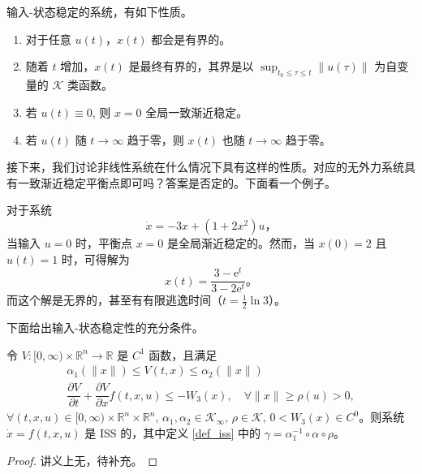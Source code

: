 \begin{note}
    输入-状态稳定的系统，有如下性质。
    \begin{enumerate}
        \item 对于任意 $u (t)$，$x (t)$ 都会是有界的。
        \item 随着 $t$ 增加，$x (t)$ 是最终有界的，其界是以 $\sup_{t_0 \leq \tau \leq t} \|  u (\tau) \|$ 为自变量的 $\mathcal{K}$ 类函数。
        \item 若 $u (t) \equiv 0$, 则 $x = 0$ 全局一致渐近稳定。
        \item 若 $u (t)$ 随 $t \rightarrow \infty$ 趋于零，则 $x(t)$ 也随 $t \to \infty$ 趋于零。
    \end{enumerate}
\end{note}

接下来，我们讨论非线性系统在什么情况下具有这样的性质。对应的无外力系统具有一致渐近稳定平衡点即可吗？答案是否定的。下面看一个例子。

\begin{example}
    对于系统
    \[
        \dot{x} = -3x + (1 + 2 x^2) u \text{，}
    \]
    当输入 $u = 0$ 时，平衡点 $x = 0$ 是全局渐近稳定的。然而，当 $x(0) = 2$ 且 $u(t) = 1$ 时，可得解为
    \[
        x(t) = \dfrac{3 - \mathrm{e}^t}{3 - 2 \mathrm{e}^t} \text{。}
    \]
    而这个解是无界的，甚至有有限逃逸时间（$t = \frac{1}{2} \ln{3}$）。
\end{example}

下面给出输入-状态稳定性的充分条件。

\begin{theorem}[输入-状态稳定性的充分条件]
    令 $V : [ 0, \infty ) \times \mathbb{R}^n \to \mathbb{R}$ 是 $C^1$ 函数，且满足
    \begin{gather*}
        \alpha_1 (\| x \|) \leq V(t, x) \leq \alpha_2 (\| x \|) \\
        \dfrac{\partial V}{\partial t} + \dfrac{\partial V}{\partial x} f(t, x, u) \leq -W_3(x), \quad \forall \| x \| \geq \rho (u) > 0,
    \end{gather*}
    $\forall (t, x, u) \in [ 0, \infty ) \times \mathbb{R}^n \times \mathbb{R}^n,\, \alpha_1, \alpha_2 \in \mathcal{K}_\infty,\, \rho \in \mathcal{K},\, 0 < W_3(x) \in C^0$。则系统 $\dot{x} = f(t, x, u)$ 是 ISS 的，其中定义 \ref{def_iss} 中的 $\gamma = \alpha_1^{-1} \circ \alpha \circ \rho$。
\end{theorem}

\begin{proof}
    讲义上无，待补充。%
\end{proof}

